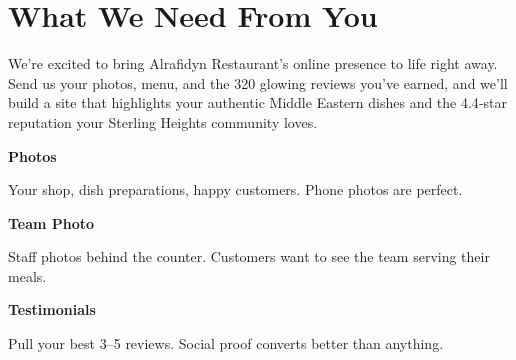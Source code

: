 \documentclass[11pt,letterpaper]{article}
\begin{document}
\vspace{0.2em}

\section*{What We Need From You}

We're excited to bring Alrafidyn Restaurant’s online presence to life right away. Send us your photos, menu, and the 320 glowing reviews you’ve earned, and we’ll build a site that highlights your authentic Middle Eastern dishes and the 4.4‑star reputation your Sterling Heights community loves.

\vspace{0.12em}

\noindent\begin{minipage}[t]{0.48\textwidth}
\begin{tcolorbox}[colframe=accent-teal, boxrule=1pt, left=0.7em, right=0.7em, top=0.5em, bottom=0.5em, arc=4pt, boxsep=0pt]
{\bfseries\small\color{accent-teal}Photos}

\vspace{0.15em}

{\small Your shop, dish preparations, happy customers. Phone photos are perfect.}
\end{tcolorbox}

\vspace{0.1em}

\begin{tcolorbox}[colframe=accent-teal, boxrule=1pt, left=0.7em, right=0.7em, top=0.5em, bottom=0.5em, arc=4pt, boxsep=0pt]
{\bfseries\small\color{accent-teal}Team Photo}

\vspace{0.15em}

{\small Staff photos behind the counter. Customers want to see the team serving their meals.}
\end{tcolorbox}

\vspace{0.1em}

\begin{tcolorbox}[colframe=accent-teal, boxrule=1pt, left=0.7em, right=0.7em, top=0.5em, bottom=0.5em, arc=4pt, boxsep=0pt]
{\bfseries\small\color{accent-teal}Testimonials}

\vspace{0.15em}

{\small Pull your best 3--5 reviews. Social proof converts better than anything.}
\end{tcolorbox}
\end{minipage}
\end{document}
